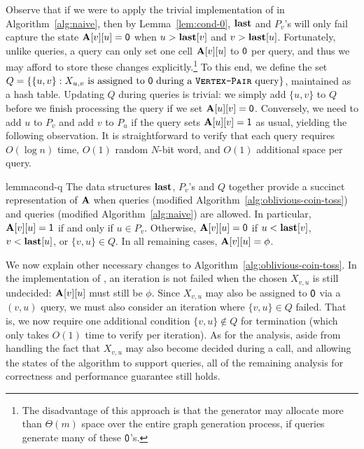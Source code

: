 Observe that if we were to apply the trivial implementation of  in Algorithm~\ref{alg:naive}, then by Lemma~\ref{lem:cond-0}, $\mathbf{last}$ and $P_v$'s will only fail capture the state $\mathbf{A}[v][u] = \mathsf{0}$ when $u > \mathbf{last}[v]$ and $v > \mathbf{last}[u]$. Fortunately, unlike  queries, a  query can only set one cell $\mathbf{A}[v][u]$ to $\mathsf{0}$ per query, and thus we may afford to store these changes explicitly.\footnote{The disadvantage of this approach is that the generator may allocate more than $\Theta(m)$ space over the entire graph generation process, if  queries generate many of these $\mathsf{0}$'s.} To this end, we define the set $Q = \{\{u,v\}: X_{u,v}\textrm{ is assigned to }\mathsf{0} \textrm{ during a \texttt{\textsc{Vertex-Pair}} query}\}$, maintained as a hash table. Updating $Q$ during  queries is trivial: we simply add $\{u,v\}$ to $Q$ before we finish processing the query if we set $\mathbf{A}[u][v]=\mathsf{0}$. Conversely, we need to add $u$ to $P_v$ and add $v$ to $P_u$ if the  query sets $\mathbf{A}[u][v]=\mathsf{1}$ as usual, yielding the following observation. It is straightforward to verify that each  query requires $O(\log n)$ time, $O(1)$ random $N$-bit word, and $O(1)$ additional space per query.

\begin{restatable}{lemma}{cond-q}\label{lem:cond-0-q}
The data structures $\mathbf{last}$, $P_v$'s and $Q$ together provide a succinct representation of $\mathbf{A}$ when  queries (modified Algorithm~\ref{alg:oblivious-coin-toss}) and  queries (modified Algorithm~\ref{alg:naive}) are allowed. In particular, $\mathbf{A}[v][u]=\mathsf{1}$ if and only if $u \in P_v$. Otherwise, $\mathbf{A}[v][u]=\mathsf{0}$ if $u <\mathbf{last}[v]$, $v < \mathbf{last}[u]$, or $\{v,u\} \in Q$. In all remaining cases, $\mathbf{A}[v][u]=\phi$.
\end{restatable}

We now explain other necessary changes to Algorithm~\ref{alg:oblivious-coin-toss}. In the implementation of , an iteration is not failed when the chosen $X_{v,u}$ is still undecided: $\mathbf{A}[v][u]$ must still be $\phi$. Since $X_{v,u}$ may also be assigned to $\mathsf{0}$ via a $(v,u)$ query, we must also consider an iteration where $\{v,u\} \in Q$ failed. That is, we now require one additional condition $\{v,u\} \notin Q$ for termination (which only takes $O(1)$ time to verify per iteration). As for the analysis, aside from handling the fact that $X_{v,u}$ may also become decided during a  call, and allowing the states of the algorithm to support  queries, all of the remaining analysis for correctness and performance guarantee still holds. 


